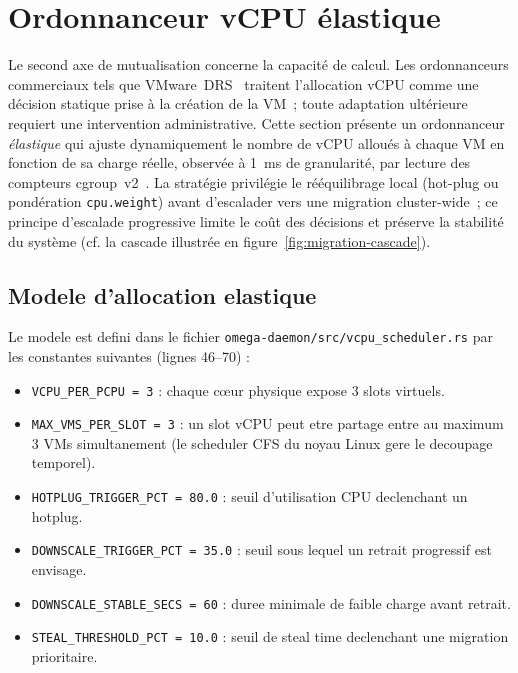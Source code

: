 \section{Ordonnanceur vCPU élastique}
\label{sec:vcpu-scheduler}

Le second axe de mutualisation concerne la capacité de calcul. Les ordonnanceurs commerciaux tels que VMware~DRS~\cite{gulati_2012_drs} traitent l'allocation vCPU comme une décision statique prise à la création de la VM~; toute adaptation ultérieure requiert une intervention administrative. Cette section présente un ordonnanceur \emph{élastique} qui ajuste dynamiquement le nombre de vCPU alloués à chaque VM en fonction de sa charge réelle, observée à 1~ms de granularité, par lecture des compteurs cgroup~v2~\cite{cgroups_v2_doc}. La stratégie privilégie le rééquilibrage local (hot-plug ou pondération \texttt{cpu.weight}) avant d'escalader vers une migration cluster-wide~; ce principe d'escalade progressive limite le coût des décisions et préserve la stabilité du système (cf. la cascade illustrée en figure~\ref{fig:migration-cascade}).

\subsection{Modele d'allocation elastique}
\label{subsec:modele-vcpu}

Le modele est defini dans le fichier \texttt{omega-daemon/src/vcpu\_scheduler.rs} par les constantes suivantes (lignes 46--70) :

\begin{itemize}
    \item \texttt{VCPU\_PER\_PCPU = 3} : chaque c\oe{}ur physique expose 3 slots virtuels.
    \item \texttt{MAX\_VMS\_PER\_SLOT = 3} : un slot vCPU peut etre partage entre au maximum 3 VMs simultanement (le scheduler CFS du noyau Linux gere le decoupage temporel).
    \item \texttt{HOTPLUG\_TRIGGER\_PCT = 80.0} : seuil d'utilisation CPU declenchant un hotplug.
    \item \texttt{DOWNSCALE\_TRIGGER\_PCT = 35.0} : seuil sous lequel un retrait progressif est envisage.
    \item \texttt{DOWNSCALE\_STABLE\_SECS = 60} : duree minimale de faible charge avant retrait.
    \item \texttt{STEAL\_THRESHOLD\_PCT = 10.0} : seuil de steal time declenchant une migration prioritaire.
\end{itemize}


